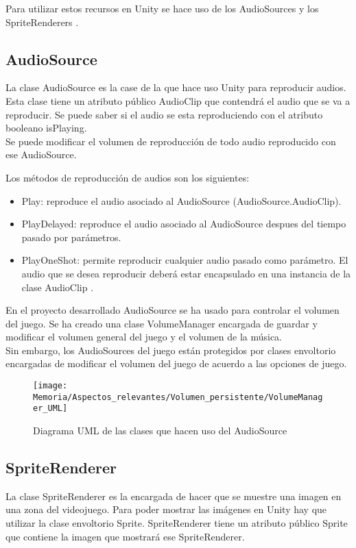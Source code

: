 Para utilizar estos recursos en Unity se hace uso de los AudioSources \cite{AudioSource} y los SpriteRenderers \cite{SpriteRenderer}.

\subsection{AudioSource}
La clase AudioSource es la case de la que hace uso Unity para reproducir audios. Esta clase tiene un atributo público AudioClip que contendrá el audio que se va a reproducir. Se puede saber si el audio se esta reproduciendo con el atributo booleano isPlaying.\\
Se puede modificar el volumen de reproducción de todo audio reproducido con ese AudioSource.

Los métodos de reproducción de audios son los siguientes:
\begin{itemize}
\item
Play: reproduce el audio asociado al AudioSource (AudioSource.AudioClip).
\item
PlayDelayed: reproduce el audio asociado al AudioSource despues del tiempo pasado por parámetros.
\item
PlayOneShot: permite reproducir cualquier audio pasado como parámetro. El audio que se desea reproducir deberá estar encapsulado en una instancia de la clase AudioClip \cite{AudioClip} .
\end{itemize}

En el proyecto desarrollado AudioSource se ha usado para controlar el volumen del juego. Se ha creado una clase VolumeManager encargada de guardar y modificar el volumen general del juego y el volumen de la música.\\
Sin embargo, los AudioSources del juego están protegidos por clases envoltorio encargadas de modificar el volumen del juego de acuerdo a las opciones de juego.

\begin{figure}[h]
\texttt{[image: Memoria/Aspectos\_relevantes/Volumen\_persistente/VolumeManager\_UML]}
\caption{Diagrama UML de las clases que hacen uso del AudioSource}
\end{figure}

\subsection{SpriteRenderer}
La clase SpriteRenderer es la encargada de hacer que se muestre una imagen en una zona del videojuego. Para poder mostrar las imágenes en Unity hay que utilizar la clase envoltorio Sprite. SpriteRenderer tiene un atributo público Sprite que contiene la imagen que mostrará ese SpriteRenderer.

